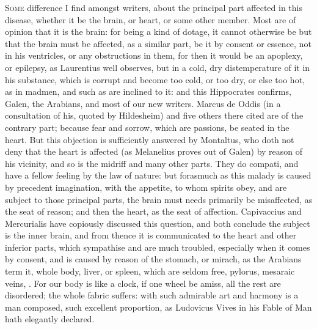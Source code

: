 {{\lettrine{S}{ome} difference I find amongst writers, about the principal part
affected in this disease, whether it be the brain, or heart, or some
other member. Most are of opinion that it is the brain: for being a
kind of dotage, it cannot otherwise be but that the brain must be
affected, as a similar part, be it by consent or essence, not in
his ventricles, or any obstructions in them, for then it would be an
apoplexy, or epilepsy, as Laurentius well observes, but in a
cold, dry distemperature of it in his substance, which is corrupt and
become too cold, or too dry, or else too hot, as in madmen, and such as
are inclined to it: and this  Hippocrates confirms, Galen, the
Arabians, and most of our new writers. Marcus de Oddis (in a
consultation of his, quoted by Hildesheim) and five others there
cited are of the contrary part; because fear and sorrow, which are
passions, be seated in the heart. But this objection is sufficiently
answered by Montaltus, who doth not deny that the heart is
affected (as Melanelius proves out of Galen) by reason of his
vicinity, and so is the midriff and many other parts. They do compati,
and have a fellow feeling by the law of nature: but forasmuch as this
malady is caused by precedent imagination, with the appetite, to whom
spirits obey, and are subject to those principal parts, the brain must
needs primarily be misaffected, as the seat of reason; and then the
heart, as the seat of affection. Capivaccius and Mercurialis have
copiously discussed this question, and both conclude the subject is the
inner brain, and from thence it is communicated to the heart and other
inferior parts, which sympathise and are much troubled, especially when
it comes by consent, and is caused by reason of the stomach, or mirach,
as the Arabians term it, whole body, liver, or spleen, which are
seldom free, pylorus, mesaraic veins, \etc{}. For our body is like a clock,
if one wheel be amiss, all the rest are disordered; the whole fabric
suffers: with such admirable art and harmony is a man composed, such
excellent proportion, as Ludovicus Vives in his Fable of Man hath
elegantly declared.

}}
